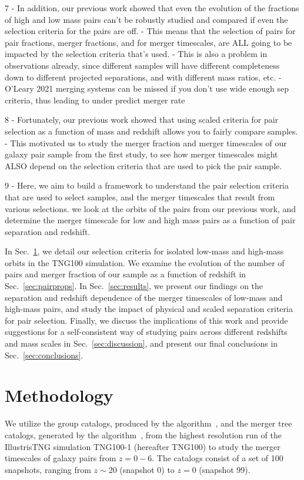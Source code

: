 \documentclass[twocolumn,linenumbers]{aastex631}
\begin{document}
7 - In addition, our previous work showed that even the evolution of the fractions of high and low mass pairs can't be robustly studied and compared if even the selection criteria for the pairs are off. 
    - This means that the selection of pairs for pair fractions, merger fractions, and for merger timescales, are ALL going to be impacted by the selection criteria that's used. 
    - This is also a problem in observations already, since different samples will have different completeness down to different projected separations, and with different mass ratios, etc. 
    - O'Leary 2021 merging systems can be missed if you don't use wide enough sep criteria, thus leading to under predict merger rate

8 - Fortunately, our previous work showed that using scaled criteria for pair selection as a function of mass and redshift allows you to fairly compare samples. 
    - This motivated us to study the merger fraction and merger timescales of our galaxy pair sample from the first study, to see how merger timescales might ALSO depend on the selection criteria that are used to pick the pair sample. 


9 - Here, we aim to build a framework to understand the pair selection criteria that are used to select samples, and the merger timescales that result from various selections.  we look at the orbits of the pairs from our previous work, and determine the merger timescale for low and high mass pairs as a function of pair separation and redshift. 

In Sec.~\ref{sec:methods}, we detail our selection criteria for isolated low-mass and high-mass orbits in the TNG100 simulation. 
We examine the evolution of the number of pairs and merger fraction of our sample as a function of redshift in Sec.~\ref{sec:pairprops}.
In Sec.~\ref{sec:results}, we present our findings on the separation and redshift dependence of the merger timescales of low-mass and high-mass pairs, and study the impact of physical and scaled separation criteria for pair selection. 
Finally, we discuss the implications of this work and provide suggestions for a self-consistent way of studying pairs across different redshifts and mass scales in Sec.~\ref{sec:discussion}, and present our final conclusions in Sec.~\ref{sec:conclusions}.



\section{Methodology} \label{sec:methods}
We utilize the group catalogs, produced by the \subfind{} algorithm~\citep{Springel2001b,Dolag2009}, and the merger tree catalogs, generated by the \sublink{} algorithm~\citep{RG2015}, from the highest resolution run of the IllustrisTNG simulation TNG100-1 (hereafter TNG100) to study the merger timescales of galaxy pairs from $z=0-6$.
The catalogs consist of a set of 100 snapshots, ranging from $z\sim20$ (snapshot 0) to $z=0$ (snapshot 99).
\end{document}
